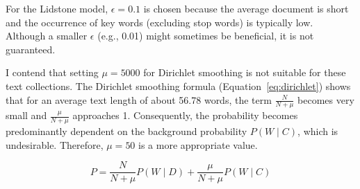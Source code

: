 \documentclass[11pt]{article}
\begin{document}
For the Lidstone model, \(\epsilon=0.1\) is chosen because the average document is short and the occurrence of key words (excluding stop words) is typically low. Although a smaller \(\epsilon\) (e.g., 0.01) might sometimes be beneficial, it is not guaranteed.

I contend that setting \(\mu = 5000\) for Dirichlet smoothing is not suitable for these text collections. The Dirichlet smoothing formula (Equation~\ref{eq:dirichlet}) shows that for an average text length of about 56.78 words, the term \(\frac{N}{N+\mu}\) becomes very small and \(\frac{\mu}{N+\mu}\) approaches 1. Consequently, the probability becomes predominantly dependent on the background probability \(P(W \mid C)\), which is undesirable. Therefore, \(\mu = 50\) is a more appropriate value.

\begin{equation}
P = \frac{N}{N + \mu}P(W \mid D) + \frac{\mu}{N + \mu}P(W \mid C)
\label{eq:dirichlet}
\end{equation}
\end{document}

